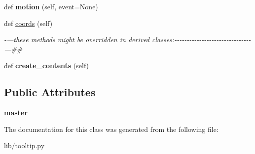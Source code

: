 \begin{DoxyCompactItemize}
\mbox{\label{class_python_01_g_u_i_1_1lib_1_1tooltip_1_1_tool_tip_af0ca05f4b73c38f0a03574cb0b13162f}} 
def {\bfseries motion} (self, event=None)
\item 
\mbox{\label{class_python_01_g_u_i_1_1lib_1_1tooltip_1_1_tool_tip_a6af130af448436dea195f2dfb705333f}} 
def \hyperlink{class_python_01_g_u_i_1_1lib_1_1tooltip_1_1_tool_tip_a6af130af448436dea195f2dfb705333f}{coords} (self)
\begin{DoxyCompactList}\small\item\em -\/---these methods might be overridden in derived classes\+:-\/-\/-\/-\/-\/-\/-\/-\/-\/-\/-\/-\/-\/-\/-\/-\/-\/-\/-\/-\/-\/-\/-\/-\/-\/-\/-\/-\/-\/-\/-\/---\#\# \end{DoxyCompactList}\item 
\mbox{\label{class_python_01_g_u_i_1_1lib_1_1tooltip_1_1_tool_tip_a8e885173d31284d8e4014dc1514b1909}} 
def {\bfseries create\+\_\+contents} (self)
\end{DoxyCompactItemize}
\subsection*{Public Attributes}
\begin{DoxyCompactItemize}
\item 
\mbox{\label{class_python_01_g_u_i_1_1lib_1_1tooltip_1_1_tool_tip_afed4f9dd9cf6487f360c1f8fac9a90f3}} 
{\bfseries master}
\end{DoxyCompactItemize}


The documentation for this class was generated from the following file\+:\begin{DoxyCompactItemize}
\item 
lib/tooltip.\+py\end{DoxyCompactItemize}
